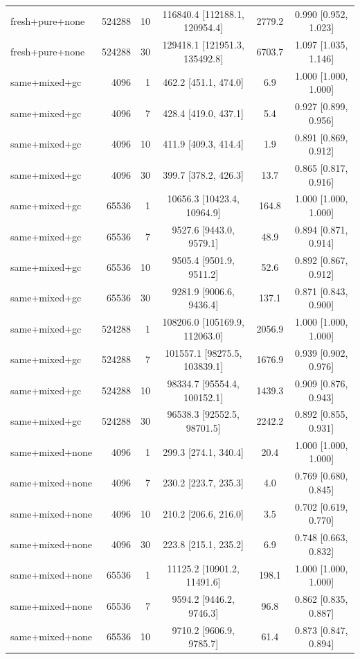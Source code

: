 \begin{longtable}{lrrccc}
fresh+pure+none & 524288 & 10 & 116840.4 [112188.1, 120954.4] & 2779.2 & 0.990 [0.952, 1.023] \\
fresh+pure+none & 524288 & 30 & 129418.1 [121951.3, 135492.8] & 6703.7 & 1.097 [1.035, 1.146] \\
same+mixed+gc & 4096 & 1 & 462.2 [451.1, 474.0] & 6.9 & 1.000 [1.000, 1.000] \\
same+mixed+gc & 4096 & 7 & 428.4 [419.0, 437.1] & 5.4 & 0.927 [0.899, 0.956] \\
same+mixed+gc & 4096 & 10 & 411.9 [409.3, 414.4] & 1.9 & 0.891 [0.869, 0.912] \\
same+mixed+gc & 4096 & 30 & 399.7 [378.2, 426.3] & 13.7 & 0.865 [0.817, 0.916] \\
same+mixed+gc & 65536 & 1 & 10656.3 [10423.4, 10964.9] & 164.8 & 1.000 [1.000, 1.000] \\
same+mixed+gc & 65536 & 7 & 9527.6 [9443.0, 9579.1] & 48.9 & 0.894 [0.871, 0.914] \\
same+mixed+gc & 65536 & 10 & 9505.4 [9501.9, 9511.2] & 52.6 & 0.892 [0.867, 0.912] \\
same+mixed+gc & 65536 & 30 & 9281.9 [9006.6, 9436.4] & 137.1 & 0.871 [0.843, 0.900] \\
same+mixed+gc & 524288 & 1 & 108206.0 [105169.9, 112063.0] & 2056.9 & 1.000 [1.000, 1.000] \\
same+mixed+gc & 524288 & 7 & 101557.1 [98275.5, 103839.1] & 1676.9 & 0.939 [0.902, 0.976] \\
same+mixed+gc & 524288 & 10 & 98334.7 [95554.4, 100152.1] & 1439.3 & 0.909 [0.876, 0.943] \\
same+mixed+gc & 524288 & 30 & 96538.3 [92552.5, 98701.5] & 2242.2 & 0.892 [0.855, 0.931] \\
same+mixed+none & 4096 & 1 & 299.3 [274.1, 340.4] & 20.4 & 1.000 [1.000, 1.000] \\
same+mixed+none & 4096 & 7 & 230.2 [223.7, 235.3] & 4.0 & 0.769 [0.680, 0.845] \\
same+mixed+none & 4096 & 10 & 210.2 [206.6, 216.0] & 3.5 & 0.702 [0.619, 0.770] \\
same+mixed+none & 4096 & 30 & 223.8 [215.1, 235.2] & 6.9 & 0.748 [0.663, 0.832] \\
same+mixed+none & 65536 & 1 & 11125.2 [10901.2, 11491.6] & 198.1 & 1.000 [1.000, 1.000] \\
same+mixed+none & 65536 & 7 & 9594.2 [9446.2, 9746.3] & 96.8 & 0.862 [0.835, 0.887] \\
same+mixed+none & 65536 & 10 & 9710.2 [9606.9, 9785.7] & 61.4 & 0.873 [0.847, 0.894] \\

\end{longtable}
